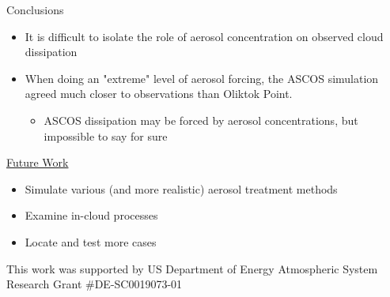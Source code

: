 \documentclass[final]{beamer}
\newlength{\sepwid}
\newlength{\onecolwid}
\begin{document}
\begin{frame}[t]
\begin{columns}[t]
\begin{column}{\onecolwid}
	\begin{block}{Conclusions}
		\begin{itemize}
			\item It is difficult to isolate the role of aerosol concentration on observed cloud dissipation
			\item When doing an "extreme" level of aerosol forcing, the ASCOS simulation agreed much closer to observations than Oliktok Point.
			\begin{itemize}
				\item ASCOS dissipation may be forced by aerosol concentrations, but impossible to say for sure
			\end{itemize}
		\end{itemize}
		
		\underline{Future Work}
		\begin{itemize}
			\item Simulate various (and more realistic) aerosol treatment methods
			\item Examine in-cloud processes
			\item Locate and test more cases
		\end{itemize}
		
		
		This work was supported by US Department of Energy Atmospheric System Research Grant #DE-SC0019073-01
	\end{block}

\end{column}
\begin{column}{\sepwid}\end{column} %

\end{columns} %

\end{frame} %
\end{document}
